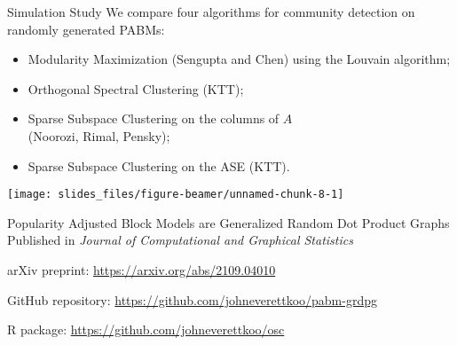 \documentclass[
  ignorenonframetext,
]{beamer}
\providecommand{\tightlist}{%
  \setlength{\itemsep}{0pt}\setlength{\parskip}{0pt}}
\begin{document}
\begin{frame}{Simulation Study}
\protect\hypertarget{simulation-study}{}
We compare four algorithms for community detection on randomly generated
PABMs:

\begin{itemize}
\tightlist
\item
  Modularity Maximization (Sengupta and Chen) using the Louvain
  algorithm;
\item
  Orthogonal Spectral Clustering (KTT);
\item
  Sparse Subspace Clustering on the columns of \(A\)\\
  (Noorozi, Rimal, Pensky);
\item
  Sparse Subspace Clustering on the ASE (KTT).
\end{itemize}

\begin{center}\texttt{[image: slides\_files/figure-beamer/unnamed-chunk-8-1]} \end{center}
\end{frame}

\begin{frame}{Popularity Adjusted Block Models are Generalized Random
Dot Product Graphs}
\protect\hypertarget{popularity-adjusted-block-models-are-generalized-random-dot-product-graphs}{}
Published in \emph{Journal of Computational and Graphical Statistics}

arXiv preprint: \url{https://arxiv.org/abs/2109.04010}

GitHub repository: \url{https://github.com/johneverettkoo/pabm-grdpg}

R package: \url{https://github.com/johneverettkoo/osc}
\end{frame}
\end{document}
